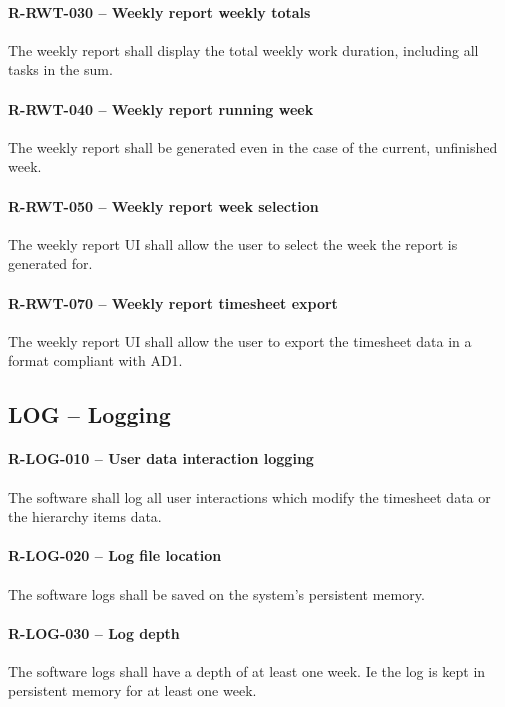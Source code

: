 \paragraph{R-RWT-030 -- Weekly report weekly totals}
The weekly report shall display the total weekly work duration, including
all tasks in the sum.

\paragraph{R-RWT-040 -- Weekly report running week}
The weekly report shall be generated even in the case of the current, unfinished
week.

\paragraph{R-RWT-050 -- Weekly report week selection}
The weekly report UI shall allow the user to select the week the report is
generated for.

\paragraph{R-RWT-070 -- Weekly report timesheet export}
The weekly report UI shall allow the user to export the timesheet data in
a format compliant with AD1.

\subsection{LOG -- Logging}
\paragraph{R-LOG-010 -- User data interaction logging}
The software shall log all user interactions which modify the timesheet
data or the hierarchy items data.

\paragraph{R-LOG-020 -- Log file location}
The software logs shall be saved on the system's persistent memory.

\paragraph{R-LOG-030 -- Log depth}
The software logs shall have a depth of at least one week. Ie the
log is kept in persistent memory for at least one week.

